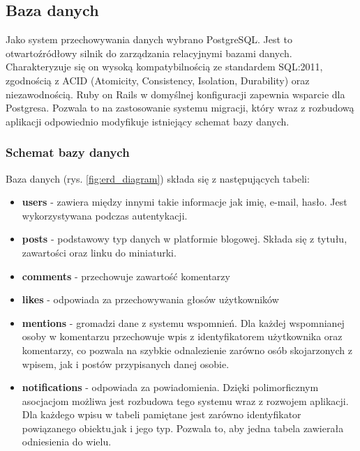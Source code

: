 \documentclass[declaration,shortabstract]{iithesis}
\begin{document}
\subsection{Baza danych}
Jako system przechowywania danych wybrano PostgreSQL. Jest to otwartoźródłowy silnik do zarządzania relacyjnymi bazami danych. Charakteryzuje się on wysoką kompatybilnością ze standardem SQL:2011, zgodnością z ACID (Atomicity, Consistency, Isolation, Durability) oraz niezawodnością. Ruby on Rails w domyślnej konfiguracji zapewnia wsparcie dla Postgresa. Pozwala to na zastosowanie systemu migracji, który wraz z rozbudową aplikacji odpowiednio modyfikuje istniejący schemat bazy danych.

\subsubsection{Schemat bazy danych}
Baza danych (rys. \ref{fig:erd_diagram}) składa się z następujących tabeli: 
\begin{itemize}
    \item \textbf{users} - zawiera między innymi takie informacje jak imię, e-mail, hasło. Jest wykorzystywana podczas autentykacji.
    \item \textbf{posts} - podstawowy typ danych w platformie blogowej. Składa się z tytułu, zawartości oraz linku do miniaturki.
    \item \textbf{comments} - przechowuje zawartość komentarzy
    \item \textbf{likes} - odpowiada za przechowywania głosów użytkowników
    \item \textbf{mentions} - gromadzi dane z systemu wspomnień. Dla każdej wspomnianej osoby w komentarzu przechowuje wpis z identyfikatorem użytkownika oraz komentarzy, co pozwala na szybkie odnalezienie zarówno osób skojarzonych z wpisem, jak i postów przypisanych danej osobie.
    \item \textbf{notifications} - odpowiada za powiadomienia. Dzięki polimorficznym asocjacjom możliwa jest rozbudowa tego systemu wraz z rozwojem aplikacji. Dla każdego wpisu w tabeli pamiętane jest zarówno identyfikator powiązanego obiektu,jak i jego typ. Pozwala to, aby jedna tabela zawierała odniesienia do wielu.
\end{itemize}
\end{document}
